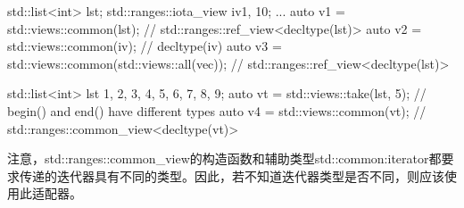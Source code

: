 \begin{cpp}
std::list<int> lst;
std::ranges::iota_view iv{1, 10};
...
auto v1 = std::views::common(lst); // std::ranges::ref_view<decltype(lst)>
auto v2 = std::views::common(iv); // decltype(iv)
auto v3 = std::views::common(std::views::all(vec));
			// std::ranges::ref_view<decltype(lst)>
			
std::list<int> lst {1, 2, 3, 4, 5, 6, 7, 8, 9};
auto vt = std::views::take(lst, 5); // begin() and end() have different types
auto v4 = std::views::common(vt); // std::ranges::common_view<decltype(vt)>
\end{cpp}

注意，std::ranges::common\_view的构造函数和辅助类型std::common:iterator都要求传递的迭代器具有不同的类型。因此，若不知道迭代器类型是否不同，则应该使用此适配器。











